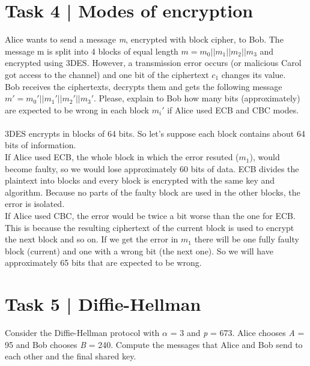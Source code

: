 \documentclass{article}
\begin{document}
\section*{Task 4 | Modes of encryption}
Alice wants to send a message \textit{m}, encrypted with block cipher, to Bob. The message m
is split into 4 blocks of equal length $m = m_0||m_1||m_2||m_3$ and encrypted using 3DES.
However, a transmission error occurs (or malicious Carol got access to the channel) and
one bit of the ciphertext $c_1$ changes its value. \\
Bob receives the ciphertexts, decrypts them and gets the following message 
$m' = m_0'||m_1'||m_2'||m_3'$. 
Please, explain to Bob how many bits (approximately) are expected to
be wrong in each block $m_i'$ if Alice used ECB and CBC modes. \\\\
3DES encrypts in blocks of 64 bits. So let's suppose each block contains about 64 bits of information. \\
If Alice used ECB, the whole block in which the error resuted ($m_1$), would
become faulty, so we would lose approximately 60 bits of data. ECB divides the plaintext
into blocks and every block is encrypted with the same key and algorithm. Because no parts
of the faulty block are used in the other blocks, the error is isolated. \\
If Alice used CBC, the error would be twice a bit worse than the one for ECB. This is because the
resulting ciphertext of the current block is used to encrypt the next block and so on. If
we get the error in $m_1$ there will be one fully faulty block (current) and one with a wrong bit (the next one).
So we will have approximately 65 bits that are expected to be wrong.


\section*{Task 5 | Diffie-Hellman}
Consider the Diffie-Hellman protocol with $\alpha$ = 3 and \textit{p} = 673. Alice chooses
\textit{A} = 95 and Bob chooses \textit{B} = 240. Compute the messages that Alice and Bob
send to each other and the final shared key.
\end{document}
